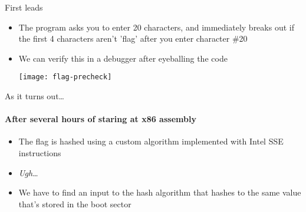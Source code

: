\begin{frame}{First leads}
    \begin{itemize}
        \item<1-> The program asks you to enter 20 characters, and immediately
                  breaks out if the first 4 characters aren't 'flag' after you
                  enter character \#20
        \item<2-> We can verify this in a debugger after eyeballing the code

        \begin{center}
             {\texttt{[image: flag-precheck]}}
        \end{center}
    \end{itemize}
\end{frame}

\begin{frame}{As it turns out\ldots}
    \framesubtitle{After several hours of staring at x86 assembly}

    \begin{itemize}
        \item<1-> The flag is \alert{hashed} using a \alert{custom algorithm}
                  implemented with Intel SSE instructions
        \item<2-> {\em Ugh\ldots}
        \item<3-> We have to find an input to the hash algorithm that hashes
                  to the same value that's stored in the boot sector
    \end{itemize}
\end{frame}

